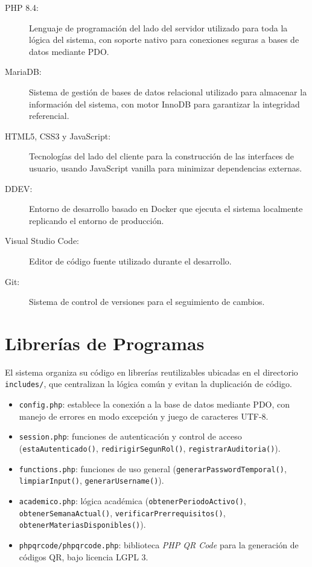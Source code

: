 \documentclass[12pt, letterpaper, oneside]{report}
\begin{document}
\begin{description}
  \item[PHP 8.4:] Lenguaje de programaci\'on del lado del servidor utilizado para toda la l\'ogica del sistema, con soporte nativo para conexiones seguras a bases de datos mediante PDO.
  \item[MariaDB:] Sistema de gesti\'on de bases de datos relacional utilizado para almacenar la informaci\'on del sistema, con motor InnoDB para garantizar la integridad referencial.
  \item[HTML5, CSS3 y JavaScript:] Tecnolog\'ias del lado del cliente para la construcci\'on de las interfaces de usuario, usando JavaScript vanilla para minimizar dependencias externas.
  \item[DDEV:] Entorno de desarrollo basado en Docker que ejecuta el sistema localmente replicando el entorno de producci\'on.
  \item[Visual Studio Code:] Editor de c\'odigo fuente utilizado durante el desarrollo.
  \item[Git:] Sistema de control de versiones para el seguimiento de cambios.
\end{description}

\section{Librer\'ias de Programas}

El sistema organiza su c\'odigo en librer\'ias reutilizables ubicadas en el directorio \texttt{includes/}, que centralizan la l\'ogica com\'un y evitan la duplicaci\'on de c\'odigo.

\begin{itemize}
  \item \texttt{config.php}: establece la conexi\'on a la base de datos mediante PDO, con manejo de errores en modo excepci\'on y juego de caracteres UTF-8.
  \item \texttt{session.php}: funciones de autenticaci\'on y control de acceso (\texttt{estaAutenticado()}, \texttt{redirigirSegunRol()}, \texttt{registrarAuditoria()}).
  \item \texttt{functions.php}: funciones de uso general (\texttt{generarPasswordTemporal()}, \texttt{limpiarInput()}, \texttt{generarUsername()}).
  \item \texttt{academico.php}: l\'ogica acad\'emica (\texttt{obtenerPeriodoActivo()}, \texttt{obtenerSemanaActual()}, \texttt{verificarPrerrequisitos()}, \texttt{obtenerMateriasDisponibles()}).
  \item \texttt{phpqrcode/phpqrcode.php}: biblioteca \emph{PHP QR Code} para la generaci\'on de c\'odigos QR, bajo licencia LGPL 3.
\end{itemize}
\end{document}
